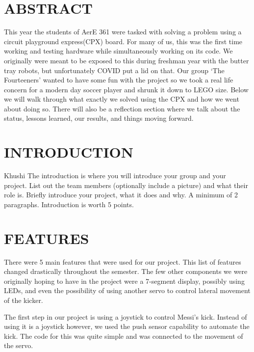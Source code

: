 \documentclass[12pt]{article}
\begin{document}
\tableofcontents
\pagebreak

\section{ABSTRACT}
This year the students of AerE 361 were tasked with solving a problem using a circuit playground express(CPX) board.
For many of us, this was the first time working and testing hardware while simultaneously working on its code. We originally
were meant to be exposed to this during freshman year with the butter tray robots, but unfortunately COVID put a lid on that.
Our group `The Fourteeners' wanted to have some fun with the project so we took a real life concern for a modern day soccer player
and shrunk it down to LEGO size. Below we will walk through what exactly we solved using the CPX and how we went about doing so.
There will also be a reflection section where we talk about the status, lessons learned, our results, and things moving forward.
\section{INTRODUCTION}
Khushi
The introduction is where you will introduce your group and your project. List out the team members (optionally include a picture) and what their role is. Briefly introduce your project, what it does and why. A minimum of 2 paragraphs. Introduction is worth 5 points.

\section{FEATURES}
There were 5 main features that were used for our project. This list of features changed drastically throughout the semester. The few other components we were originally hoping to have in the project were a 7-segment display, possibly using LEDs, and even the possibility of using another servo to control lateral movement of the kicker. 

The first step in our project is using a joystick to control Messi's kick. Instead of using it is a joystick however, we used the push sensor capability to automate the kick. The code for this was quite simple and was connected to the movement of the servo. 
\end{document}

